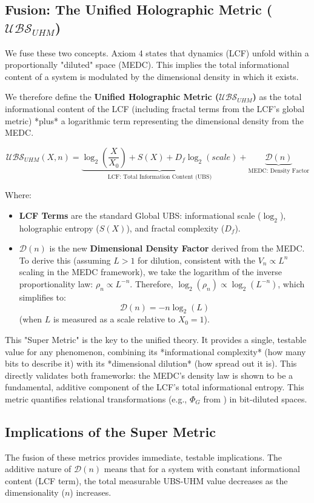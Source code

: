 \documentclass[11pt, a4paper]{article}
\begin{document}
		\subsection{Fusion: The Unified Holographic Metric (\texorpdfstring{$\mathcal{UBS}_{UHM}$}{UBS-UHM})}
		
		We fuse these two concepts. Axiom 4 states that dynamics (LCF) unfold within a proportionally "diluted" space (MEDC). This implies the total informational content of a system is modulated by the dimensional density in which it exists.
		
		We therefore define the \textbf{Unified Holographic Metric ($\mathcal{UBS}_{UHM}$)} as the total informational content of the LCF (including fractal terms from the LCF's global metric) *plus* a logarithmic term representing the dimensional density from the MEDC.
		
		\[
		\mathcal{UBS}_{UHM}(X, n) = \underbrace{\log_2 \left( \frac{X}{X_0} \right) + S(X) + D_f \log_2(scale)}_{\text{LCF: Total Information Content (UBS)}} + \underbrace{\mathcal{D}(n)}_{\text{MEDC: Density Factor}}
		\]
		
		Where:
		\begin{itemize}
			\item \textbf{LCF Terms} are the standard Global UBS: informational scale ($\log_2$), holographic entropy ($S(X)$), and fractal complexity ($D_f$).
			\item \textbf{$\mathcal{D}(n)$} is the new \textbf{Dimensional Density Factor} derived from the MEDC. To derive this (assuming $L>1$ for dilution, consistent with the $V_n \propto L^n$ scaling in the MEDC framework), we take the logarithm of the inverse proportionality law:
			$\rho_n \propto L^{-n}$.
			Therefore, $\log_2(\rho_n) \propto \log_2(L^{-n})$, which simplifies to:
			\[
			\mathcal{D}(n) = -n \log_2(L)
			\]
			(when $L$ is measured as a scale relative to $X_0=1$).
		\end{itemize}
		
		This "Super Metric" is the key to the unified theory. It provides a single, testable value for any phenomenon, combining its *informational complexity* (how many bits to describe it) with its *dimensional dilution* (how spread out it is). This directly validates both frameworks: the MEDC's density law is shown to be a fundamental, additive component of the LCF's total informational entropy. This metric quantifies relational transformations (e.g., $\Phi_G$ from \cite{Triadic}) in bit-diluted spaces.
		
		\subsection{Implications of the Super Metric}
		The fusion of these metrics provides immediate, testable implications. The additive nature of $\mathcal{D}(n)$ means that for a system with constant informational content (LCF term), the total measurable UBS-UHM value decreases as the dimensionality ($n$) increases.
		
\end{document}
